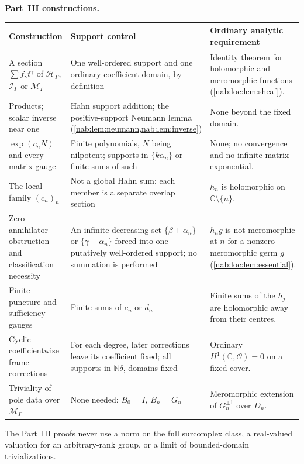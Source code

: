 \documentclass[11pt,letterpaper]{article}
\theoremstyle{definition}
\theoremstyle{remark}
\newcommand{\C}{\mathbb C}
\newcommand{\N}{\mathbb N}
\newcommand{\OO}{\mathcal O}
\newcommand{\HH}{\mathscr H_\Gamma}
\newcommand{\II}{\mathscr I_\Gamma}
\newcommand{\MM}{\mathscr M_\Gamma}
\numberwithin{equation}{section}
\begin{document}
\medskip\noindent\textbf{Part~III constructions.}
\begin{center}\small
\begin{tabular}{@{}L{0.26\textwidth}L{0.35\textwidth}L{0.29\textwidth}@{}}
\toprule
Construction & Support control & Ordinary analytic requirement\\
\midrule
A section $\sum f_\gamma t^\gamma$ of $\HH$, $\II$ or $\MM$ &
One well-ordered support and one ordinary coefficient domain, by definition &
Identity theorem for holomorphic and meromorphic functions
(\cref{nab:loc:lem:sheaf}).\\ \addlinespace[0.35em]
Products; scalar inverse near one &
Hahn support addition; the positive-support Neumann lemma
(\cref{nab:lem:neumann,nab:lem:inverse}) &
None beyond the fixed domain.\\ \addlinespace[0.35em]
$\exp(c_nN)$ and every matrix gauge &
Finite polynomials, $N$ being nilpotent; supports in
$\{k\alpha_n\}$ or finite sums of such &
None; no convergence and no infinite matrix exponential.\\ \addlinespace[0.35em]
The local family $(c_n)_n$ &
Not a global Hahn sum; each member is a separate overlap section &
$h_n$ is holomorphic on $\C\setminus\{n\}$.\\ \addlinespace[0.35em]
Zero-annihilator obstruction and classification necessity &
An infinite decreasing set $\{\beta+\alpha_n\}$ or $\{\gamma+\alpha_n\}$ forced
into one putatively well-ordered support; no summation is performed &
$h_ng$ is not meromorphic at $n$ for a nonzero meromorphic germ $g$
(\cref{nab:loc:lem:essential}).\\ \addlinespace[0.35em]
Finite-puncture and sufficiency gauges &
Finite sums of $c_n$ or $d_n$ &
Finite sums of the $h_j$ are holomorphic away from their centres.\\ \addlinespace[0.35em]
Cyclic coefficientwise frame corrections &
For each degree, later corrections leave its coefficient fixed; all supports
in $\N\delta$, domains fixed &
Ordinary $H^1(\C,\OO)=0$ on a fixed cover.\\ \addlinespace[0.35em]
Triviality of pole data over $\MM$ &
None needed: $B_0=I$, $B_n=G_n$ &
Meromorphic extension of $G_n^{\pm1}$ over $D_n$.\\
\bottomrule
\end{tabular}
\end{center}
The Part~III proofs never use a norm on the full surcomplex class, a
real-valued valuation for an arbitrary-rank group, or a limit of
bounded-domain trivializations.
\end{document}
